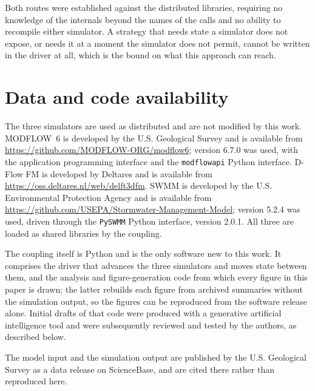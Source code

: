 \documentclass[preprint,authoryear,11pt]{elsarticle}
\begin{document}
Both routes were established against the distributed libraries, requiring no knowledge of the internals beyond the names of the calls and no ability to recompile either simulator. A strategy that needs state a simulator does not expose, or needs it at a moment the simulator does not permit, cannot be written in the driver at all, which is the bound on what this approach can reach.

\section*{Data and code availability}

The three simulators are used as distributed and are not modified by this work. MODFLOW~6 is developed by the U.S. Geological Survey and is available from \url{https://github.com/MODFLOW-ORG/modflow6}; version 6.7.0 was used, with the application programming interface and the \texttt{modflowapi} Python interface. D-Flow FM is developed by Deltares and is available from \url{https://oss.deltares.nl/web/delft3dfm}. SWMM is developed by the U.S. Environmental Protection Agency and is available from \url{https://github.com/USEPA/Stormwater-Management-Model}; version 5.2.4 was used, driven through the \texttt{PySWMM} Python interface, version 2.0.1. All three are loaded as shared libraries by the coupling.

The coupling itself is Python and is the only software new to this work. It comprises the driver that advances the three simulators and moves state between them, and the analysis and figure-generation code from which every figure in this paper is drawn; the latter rebuilds each figure from archived summaries without the simulation output, so the figures can be reproduced from the software release alone. Initial drafts of that code were produced with a generative artificial intelligence tool and were subsequently reviewed and tested by the authors, as described below. %

The model input and the simulation output are published by the U.S. Geological Survey as a data release on ScienceBase, and are cited there rather than reproduced here. %

\end{document}
